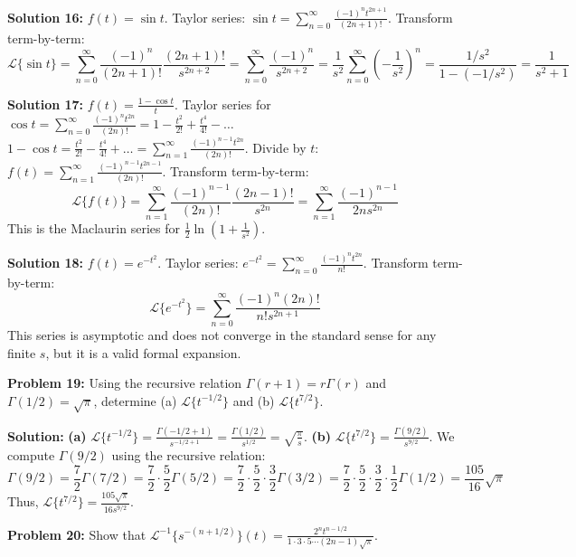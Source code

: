 \documentclass[11pt, letterpaper]{article}
\theoremstyle{definition}
\theoremstyle{remark}
\begin{document}
\textbf{Solution 16:} $f(t) = \sin t$.
Taylor series: $\sin t = \sum_{n=0}^\infty \frac{(-1)^n t^{2n+1}}{(2n+1)!}$.
Transform term-by-term:
\[ \mathcal{L}\{\sin t\} = \sum_{n=0}^\infty \frac{(-1)^n}{(2n+1)!} \frac{(2n+1)!}{s^{2n+2}} = \sum_{n=0}^\infty \frac{(-1)^n}{s^{2n+2}} = \frac{1}{s^2} \sum_{n=0}^\infty \left(-\frac{1}{s^2}\right)^n = \frac{1/s^2}{1 - (-1/s^2)} = \frac{1}{s^2+1} \]

\textbf{Solution 17:} $f(t) = \frac{1 - \cos t}{t}$.
Taylor series for $\cos t = \sum_{n=0}^\infty \frac{(-1)^n t^{2n}}{(2n)!} = 1 - \frac{t^2}{2!} + \frac{t^4}{4!} - \dots$
$1 - \cos t = \frac{t^2}{2!} - \frac{t^4}{4!} + \dots = \sum_{n=1}^\infty \frac{(-1)^{n-1} t^{2n}}{(2n)!}$.
Divide by $t$: $f(t) = \sum_{n=1}^\infty \frac{(-1)^{n-1} t^{2n-1}}{(2n)!}$.
Transform term-by-term:
\[ \mathcal{L}\{f(t)\} = \sum_{n=1}^\infty \frac{(-1)^{n-1}}{(2n)!} \frac{(2n-1)!}{s^{2n}} = \sum_{n=1}^\infty \frac{(-1)^{n-1}}{2n s^{2n}} \]
This is the Maclaurin series for $\frac{1}{2} \ln(1 + \frac{1}{s^2})$.

\textbf{Solution 18:} $f(t) = e^{-t^2}$.
Taylor series: $e^{-t^2} = \sum_{n=0}^\infty \frac{(-1)^n t^{2n}}{n!}$.
Transform term-by-term:
\[ \mathcal{L}\{e^{-t^2}\} = \sum_{n=0}^\infty \frac{(-1)^n (2n)!}{n! s^{2n+1}} \]
This series is asymptotic and does not converge in the standard sense for any finite $s$, but it is a valid formal expansion.

\vspace{1em}
\textbf{Problem 19:} Using the recursive relation $\Gamma(r+1) = r\Gamma(r)$ and $\Gamma(1/2) = \sqrt{\pi}$, determine (a) $\mathcal{L}\{t^{-1/2}\}$ and (b) $\mathcal{L}\{t^{7/2}\}$.

\textbf{Solution:}
\textbf{(a)} $\mathcal{L}\{t^{-1/2}\} = \frac{\Gamma(-1/2 + 1)}{s^{-1/2 + 1}} = \frac{\Gamma(1/2)}{s^{1/2}} = \sqrt{\frac{\pi}{s}}$.
\textbf{(b)} $\mathcal{L}\{t^{7/2}\} = \frac{\Gamma(9/2)}{s^{9/2}}$.
We compute $\Gamma(9/2)$ using the recursive relation:
\[ \Gamma(9/2) = \frac{7}{2}\Gamma(7/2) = \frac{7}{2} \cdot \frac{5}{2}\Gamma(5/2) = \frac{7}{2} \cdot \frac{5}{2} \cdot \frac{3}{2}\Gamma(3/2) = \frac{7}{2} \cdot \frac{5}{2} \cdot \frac{3}{2} \cdot \frac{1}{2}\Gamma(1/2) = \frac{105}{16}\sqrt{\pi} \]
Thus, $\mathcal{L}\{t^{7/2}\} = \frac{105\sqrt{\pi}}{16 s^{9/2}}$.

\vspace{1em}
\textbf{Problem 20:} Show that $\mathcal{L}^{-1}\{s^{-(n+1/2)}\}(t) = \frac{2^n t^{n-1/2}}{1 \cdot 3 \cdot 5 \cdots (2n-1) \sqrt{\pi}}$.
\end{document}
